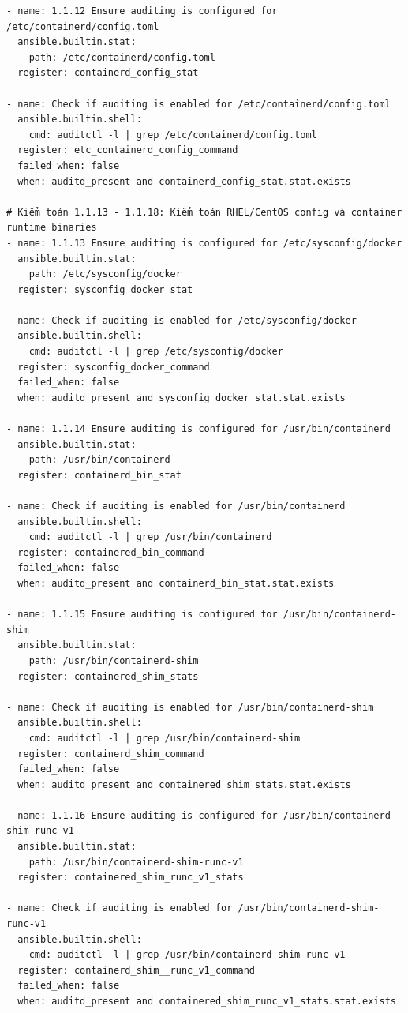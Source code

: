 {\begin{verbatim}
- name: 1.1.12 Ensure auditing is configured for /etc/containerd/config.toml
  ansible.builtin.stat:
    path: /etc/containerd/config.toml
  register: containerd_config_stat

- name: Check if auditing is enabled for /etc/containerd/config.toml
  ansible.builtin.shell:
    cmd: auditctl -l | grep /etc/containerd/config.toml
  register: etc_containerd_config_command
  failed_when: false
  when: auditd_present and containerd_config_stat.stat.exists

# Kiểm toán 1.1.13 - 1.1.18: Kiểm toán RHEL/CentOS config và container runtime binaries
- name: 1.1.13 Ensure auditing is configured for /etc/sysconfig/docker
  ansible.builtin.stat:
    path: /etc/sysconfig/docker
  register: sysconfig_docker_stat

- name: Check if auditing is enabled for /etc/sysconfig/docker
  ansible.builtin.shell:
    cmd: auditctl -l | grep /etc/sysconfig/docker
  register: sysconfig_docker_command
  failed_when: false
  when: auditd_present and sysconfig_docker_stat.stat.exists

- name: 1.1.14 Ensure auditing is configured for /usr/bin/containerd
  ansible.builtin.stat:
    path: /usr/bin/containerd
  register: containerd_bin_stat

- name: Check if auditing is enabled for /usr/bin/containerd
  ansible.builtin.shell:
    cmd: auditctl -l | grep /usr/bin/containerd
  register: containered_bin_command
  failed_when: false
  when: auditd_present and containerd_bin_stat.stat.exists

- name: 1.1.15 Ensure auditing is configured for /usr/bin/containerd-shim
  ansible.builtin.stat:
    path: /usr/bin/containerd-shim
  register: containered_shim_stats

- name: Check if auditing is enabled for /usr/bin/containerd-shim
  ansible.builtin.shell:
    cmd: auditctl -l | grep /usr/bin/containerd-shim
  register: containerd_shim_command
  failed_when: false
  when: auditd_present and containered_shim_stats.stat.exists

- name: 1.1.16 Ensure auditing is configured for /usr/bin/containerd-shim-runc-v1
  ansible.builtin.stat:
    path: /usr/bin/containerd-shim-runc-v1
  register: containered_shim_runc_v1_stats

- name: Check if auditing is enabled for /usr/bin/containerd-shim-runc-v1
  ansible.builtin.shell:
    cmd: auditctl -l | grep /usr/bin/containerd-shim-runc-v1
  register: containerd_shim__runc_v1_command
  failed_when: false
  when: auditd_present and containered_shim_runc_v1_stats.stat.exists


\end{verbatim}}
